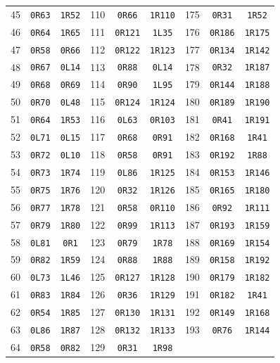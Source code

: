 \documentclass[10pt,a4paper]{article}
\begin{document}
\begin{center}
\begin{tabular}{rcc@{\hspace{14pt}}rcc@{\hspace{14pt}}rcc}
45 & \texttt{0R63} & \texttt{1R52} & 110 & \texttt{0R66} & \texttt{1R110} & 175 & \texttt{0R31} & \texttt{1R52} \\
46 & \texttt{0R64} & \texttt{1R65} & 111 & \texttt{0R121} & \texttt{1L35} & 176 & \texttt{0R186} & \texttt{1R175} \\
47 & \texttt{0R58} & \texttt{0R66} & 112 & \texttt{0R122} & \texttt{1R123} & 177 & \texttt{0R134} & \texttt{1R142} \\
48 & \texttt{0R67} & \texttt{0L14} & 113 & \texttt{0R88} & \texttt{0L14} & 178 & \texttt{0R32} & \texttt{1R187} \\
49 & \texttt{0R68} & \texttt{0R69} & 114 & \texttt{0R90} & \texttt{1L95} & 179 & \texttt{0R144} & \texttt{1R188} \\
50 & \texttt{0R70} & \texttt{0L48} & 115 & \texttt{0R124} & \texttt{1R124} & 180 & \texttt{0R189} & \texttt{1R190} \\
51 & \texttt{0R64} & \texttt{1R53} & 116 & \texttt{0L63} & \texttt{0R103} & 181 & \texttt{0R41} & \texttt{1R191} \\
52 & \texttt{0L71} & \texttt{0L15} & 117 & \texttt{0R68} & \texttt{0R91} & 182 & \texttt{0R168} & \texttt{1R41} \\
53 & \texttt{0R72} & \texttt{0L10} & 118 & \texttt{0R58} & \texttt{0R91} & 183 & \texttt{0R192} & \texttt{1R88} \\
54 & \texttt{0R73} & \texttt{1R74} & 119 & \texttt{0L86} & \texttt{1R125} & 184 & \texttt{0R153} & \texttt{1R146} \\
55 & \texttt{0R75} & \texttt{1R76} & 120 & \texttt{0R32} & \texttt{1R126} & 185 & \texttt{0R165} & \texttt{1R180} \\
56 & \texttt{0R77} & \texttt{1R78} & 121 & \texttt{0R58} & \texttt{0R110} & 186 & \texttt{0R92} & \texttt{1R111} \\
57 & \texttt{0R79} & \texttt{1R80} & 122 & \texttt{0R99} & \texttt{1R113} & 187 & \texttt{0R193} & \texttt{1R159} \\
58 & \texttt{0L81} & \texttt{0R1} & 123 & \texttt{0R79} & \texttt{1R78} & 188 & \texttt{0R169} & \texttt{1R154} \\
59 & \texttt{0R82} & \texttt{1R59} & 124 & \texttt{0R88} & \texttt{1R88} & 189 & \texttt{0R158} & \texttt{1R192} \\
60 & \texttt{0L73} & \texttt{1L46} & 125 & \texttt{0R127} & \texttt{1R128} & 190 & \texttt{0R179} & \texttt{1R182} \\
61 & \texttt{0R83} & \texttt{1R84} & 126 & \texttt{0R36} & \texttt{1R129} & 191 & \texttt{0R182} & \texttt{1R41} \\
62 & \texttt{0R54} & \texttt{1R85} & 127 & \texttt{0R130} & \texttt{1R131} & 192 & \texttt{0R149} & \texttt{1R168} \\
63 & \texttt{0L86} & \texttt{1R87} & 128 & \texttt{0R132} & \texttt{1R133} & 193 & \texttt{0R76} & \texttt{1R144} \\
64 & \texttt{0R58} & \texttt{0R82} & 129 & \texttt{0R31} & \texttt{1R98} &  &  &  \\
\bottomrule\end{tabular}\end{center}
\end{document}
